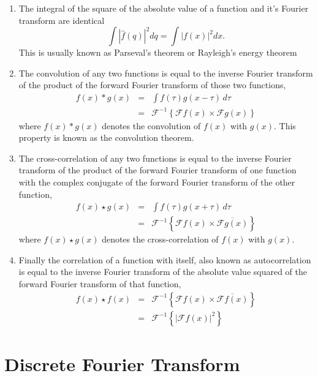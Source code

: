 \begin{enumerate}
\item The integral of the square of the absolute value of a function and it's Fourier transform are identical
\begin{equation}
\int |\hat{f}(q)|^2 dq = \int |f(x)|^2 dx.
\end{equation}
This is usually known as Parseval's theorem or Rayleigh's energy theorem

\item The convolution of any two functions is equal to the inverse Fourier transform of the product of the forward Fourier transform of those two functions,
\begin{eqnarray}
f(x) * g(x) & = & \int f(\tau) g(x-\tau) \, d\tau \nonumber \\
& = & \mathscr{F}^{-1}\left\{\mathscr{F}f(x) \times \mathscr{F}g(x)\right\}
\end{eqnarray}
where $f(x) * g(x)$ denotes the convolution of $f(x)$ with $g(x)$. This property
is known as the convolution theorem.

\item The cross-correlation of any two functions is equal to the inverse Fourier
  transform of the product of the forward Fourier transform of one function with
  the complex conjugate of the forward Fourier transform of the other function,
\begin{eqnarray}
f(x) \star g(x) & = & \int f(\tau) g(x+\tau) \, d\tau \nonumber \\ 
& = & \mathscr{F}^{-1}\left\{\mathscr{F}f(x) \times \overline{\mathscr{F}g(x)}\right\}
\end{eqnarray}
where $f(x) \star g(x)$ denotes the cross-correlation of $f(x)$ with $g(x)$.
 
\item Finally the correlation of a function with itself, also known as
  autocorrelation is equal to the inverse Fourier transform of the absolute
  value squared of the forward Fourier transform of that function,
  \begin{eqnarray}
f(x) \star f(x) & = & \mathscr{F}^{-1}\left\{\mathscr{F}f(x) 
  \times \overline{\mathscr{F}f(x)}\right\} \nonumber \\
& = & \mathscr{F}^{-1}\left\{|\mathscr{F}f(x)|^2\right\}
\end{eqnarray}
\end{enumerate}

\section{Discrete Fourier Transform}

